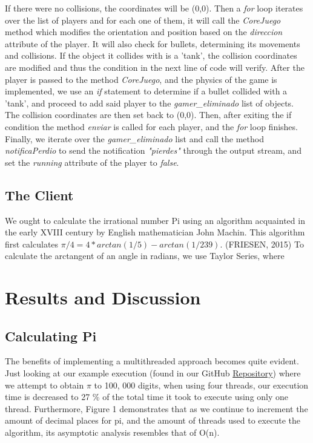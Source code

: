 \documentclass[10pt,a4paper]{article}
\theoremstyle{definition}
\begin{document}
If there were no collisions, the coordinates will be (0,0).
Then a \textit{for} loop iterates over the list of players and for each one of them, it will call the \textit{CoreJuego} method which modifies the orientation and position based on the \textit{direccion} attribute of the player. 
It will also check for bullets, determining its movements and collisions. 
If the object it collides with is a 'tank', the collision coordinates are modified and thus the condition in the next line of code will verify.
After the player is passed to the method \textit{CoreJuego}, and the physics of the game is implemented, we use an \textit{if} statement to determine if a bullet collided with a 'tank', and proceed to add said player to the \textit{gamer\_eliminado} list of objects. 
The collision coordinates are then set back to (0,0). 
Then, after exiting the if condition the method \textit{enviar} is called for each player, and the \textit{for} loop finishes. 
Finally, we iterate over the \textit{gamer\_eliminado} list and call the method \textit{notificaPerdio} to send the notification \textit{"pierdes"} through the output stream, and set the \textit{running} attribute of the player to \textit{false}.

\subsection{The Client}
We ought to calculate the irrational number Pi using an algorithm acquainted in the early XVIII century by English mathematician John Machin. This algorithm first calculates \(\pi/4 = 4 * arctan(1/5) - arctan(1/239)\). (FRIESEN, 2015)\cite{FRIESEN2015} To calculate the arctangent of an angle in radians, we use Taylor Series, where\\

\section{Results and Discussion}
\subsection{Calculating Pi}

The benefits of implementing a multithreaded approach becomes quite evident. Just looking at our example execution (found in our GitHub \href{https://github.com/ezevallos/CC462_EjemplosConcurrencia}{Repository}) where we attempt to obtain \(\pi\) to 100, 000 digits, when using four threads, our execution time is decreased to 27 \% of the total time it took to execute using only one thread. Furthermore, Figure 1 demonstrates that as we continue to increment the amount of decimal places for pi, and the amount of threads used to execute the algorithm, its asymptotic analysis resembles that of O(n).
\end{document}
